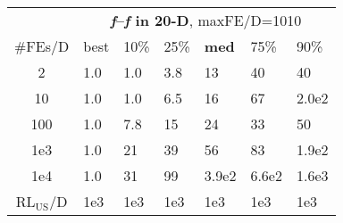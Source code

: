 \begin{tabular}{c|llllll}
 & \multicolumn{6}{|c}{\textbf{\textit{f}\raisebox{-0.35ex}{1}--\textit{f}\raisebox{-0.35ex}{24} in 20-D}, maxFE/D=1010}\\
\#FEs/D & best & 10\% & 25\% & \textbf{med} & 75\% & 90\%\\
2 & \hspace*{1ex}1.0 & \hspace*{1ex}1.0 & \hspace*{1ex}3.8 & 13 & 40 & 40\\
10 & \hspace*{1ex}1.0 & \hspace*{1ex}1.0 & \hspace*{1ex}6.5 & 16 & 67 & 2.0e2\\
100 & \hspace*{1ex}1.0 & \hspace*{1ex}7.8 & 15 & 24 & 33 & 50\\
1e3 & \hspace*{1ex}1.0 & 21 & 39 & 56 & 83 & 1.9e2\\
1e4 & \hspace*{1ex}1.0 & 31 & 99 & 3.9e2 & 6.6e2 & 1.6e3\\
$\text{RL}_{\text{US}}$/D & 1e3 & 1e3 & 1e3 & 1e3 & 1e3 & 1e3
\end{tabular}
